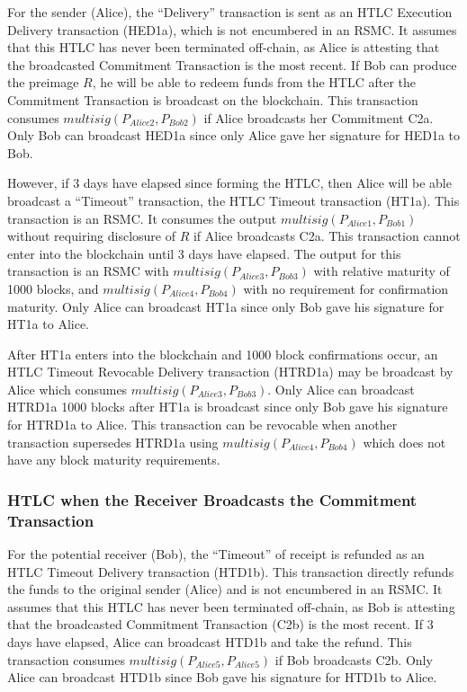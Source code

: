 \documentclass[letterpaper,11pt]{article}
\begin{document}
For the sender (Alice), the ``Delivery'' transaction is sent as an HTLC
Execution Delivery transaction (HED1a), which is not encumbered in an RSMC. It
assumes that this HTLC has never been terminated off-chain, as Alice is
attesting that the broadcasted Commitment Transaction is the most recent. If Bob
can produce the preimage $R$, he will be able to redeem funds from the HTLC
after the Commitment Transaction is broadcast on the blockchain. This
transaction consumes $multisig(P_{Alice2}, P_{Bob2})$ if Alice broadcasts her
Commitment C2a. Only Bob can broadcast HED1a since only Alice gave her signature
for HED1a to Bob.

However, if 3 days have elapsed since forming the HTLC, then Alice will be able
broadcast a ``Timeout'' transaction, the HTLC Timeout transaction (HT1a). This
transaction is an RSMC. It consumes the output $multisig(P_{Alice1}, P_{Bob1})$
without requiring disclosure of $R$ if Alice broadcasts C2a. This transaction
cannot enter into the blockchain until 3 days have elapsed. The output for this
transaction is an RSMC with $multisig(P_{Alice3}, P_{Bob3})$ with relative
maturity of 1000 blocks, and $multisig(P_{Alice4}, P_{Bob4})$ with no
requirement for confirmation maturity. Only Alice can broadcast HT1a since only
Bob gave his signature for HT1a to Alice.

After HT1a enters into the blockchain and 1000 block confirmations occur, an
HTLC Timeout Revocable Delivery transaction (HTRD1a) may be broadcast by Alice
which consumes $multisig(P_{Alice3}, P_{Bob3})$. Only Alice can broadcast HTRD1a
1000 blocks after HT1a is broadcast since only Bob gave his signature for HTRD1a
to Alice. This transaction can be revocable when another transaction supersedes
HTRD1a using $multisig(P_{Alice4}, P_{Bob4})$ which does not have any block
maturity requirements.

\subsubsection{HTLC when the Receiver Broadcasts the Commitment Transaction}

For the potential receiver (Bob), the ``Timeout'' of receipt is refunded as an
HTLC Timeout Delivery transaction (HTD1b). This transaction directly refunds the
funds to the original sender (Alice) and is not encumbered in an RSMC. It
assumes that this HTLC has never been terminated off-chain, as Bob is attesting
that the broadcasted Commitment Transaction (C2b) is the most recent. If 3 days
have elapsed, Alice can broadcast HTD1b and take the refund. This transaction
consumes $multisig(P_{Alice5}, P_{Alice5})$ if Bob broadcasts C2b. Only Alice
can broadcast HTD1b since Bob gave his signature for HTD1b to Alice.
\end{document}
